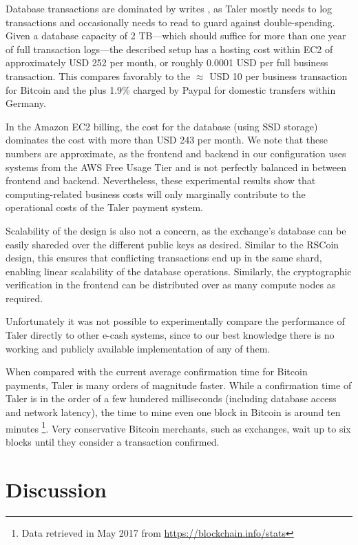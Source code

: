 \documentclass[sigconf, authordraft]{acmart}
\begin{document}
Database transactions are dominated by writes%
, as Taler mostly needs to log
transactions and occasionally needs to read to guard against
double-spending.  Given a database capacity of 2 TB---which should
suffice for more than one year of full transaction logs---the
described setup has a hosting cost within EC2 of approximately USD 252
per month, or roughly 0.0001 USD per full business transaction.  This
compares favorably to the $\approx$ USD 10 per business transaction
for Bitcoin and the  plus 1.9\% charged by Paypal for
domestic transfers within Germany.

In the Amazon EC2 billing, the cost for the database (using SSD
storage) dominates the cost with more than USD 243 per month.  We note
that these numbers are approximate, as the frontend and backend in our
configuration uses systems from the AWS Free Usage Tier and is not
perfectly balanced in between frontend and backend.  Nevertheless,
these experimental results show that computing-related business costs
will only marginally contribute to the operational costs of the Taler
payment system.

Scalability of the design is also not a concern, as the exchange's
database can be easily shareded over the different public keys as
desired.  Similar to the RSCoin~\cite{danezis2016rscoin} design, this
ensures that conflicting transactions end up in the same shard,
enabling linear scalability of the database operations.  Similarly,
the cryptographic verification in the frontend can be distributed over
as many compute nodes as required.

Unfortunately it was not possible to experimentally compare the performance of
Taler directly to other e-cash systems, since to our best knowledge there
is no working and publicly available implementation of any of them.

When compared with the current average confirmation time for Bitcoin payments,
Taler is many orders of magnitude faster.  While a confirmation time of Taler
is in the order of a few hundered milliseconds (including database access and
network latency), the time to mine even one block in Bitcoin is around ten
minutes \footnote{Data retrieved in May 2017 from
\url{https://blockchain.info/stats}}.  Very conservative Bitcoin merchants,
such as exchanges, wait up to six blocks until they consider a transaction
confirmed.

\section{Discussion}
\end{document}

